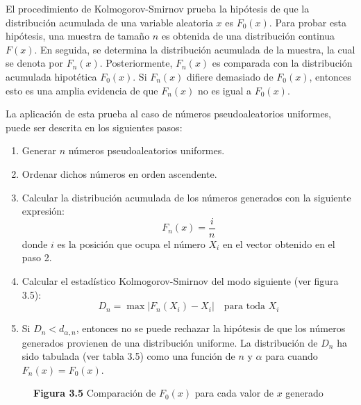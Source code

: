 \documentclass[11pt,letterpaper]{report}
\begin{document}
El procedimiento de Kolmogorov-Smirnov prueba la hipótesis de que la
distribución acumulada de una variable aleatoria $x$ es $F_0(x)$. Para
probar esta hipótesis, una muestra de tamaño $n$ es obtenida de una
distribución continua $F(x)$. En seguida, se determina la distribución
acumulada de la muestra, la cual se denota por $F_n(x)$. Posteriormente,
$F_n(x)$ es comparada con la distribución acumulada hipotética $F_0(x)$.
Si $F_n(x)$ difiere demasiado de $F_0(x)$, entonces esto es una amplia
evidencia de que $F_n(x)$ no es igual a $F_0(x)$.

La aplicación de esta prueba al caso de números pseudoaleatorios
uniformes, puede ser descrita en los siguientes pasos:

\begin{enumerate}
\item Generar $n$ números pseudoaleatorios uniformes.
\item Ordenar dichos números en orden ascendente.
\item Calcular la distribución acumulada de los números generados con
la siguiente expresión:
\begin{equation}
F_n(x) = \frac{i}{n}
\end{equation}
donde $i$ es la posición que ocupa el número $X_i$ en el vector
obtenido en el paso 2.
\item Calcular el estadístico Kolmogorov-Smirnov del modo siguiente
(ver figura 3.5):
\begin{equation}
D_n = \max |F_n(X_i) - X_i| \quad \text{para toda } X_i
\end{equation}
\item Si $D_n < d_{\alpha,n}$, entonces no se puede rechazar la
hipótesis de que los números generados provienen de una distribución
uniforme. La distribución de $D_n$ ha sido tabulada (ver tabla 3.5)
como una función de $n$ y $\alpha$ para cuando $F_n(x) = F_0(x)$.
\end{enumerate}

\begin{figure}[H]
\centering
{}
\caption*{\textbf{Figura 3.5} Comparación de $F_0(x)$ para cada valor de $x$ generado}
\end{figure}
\end{document}
